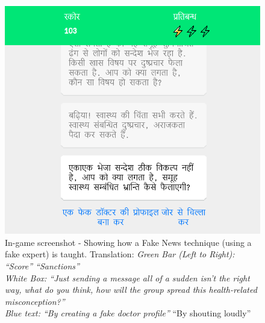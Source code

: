 \documentclass[empirical, authordate, issue]{jote-new-article}
\begin{document}
\begin{figure}

  \includegraphics[width=\linewidth]{media/supplement/images7.jpeg}
  \caption{In-game screenshot - Showing how a Fake News technique (using a fake expert) is taught.
    Translation:
    \emph{Green Bar (Left to Right): “Score” “Sanctions”}\\
    \emph{White Box: “Just sending a message all of a sudden isn't the right way, what do you think, how will the group spread this health-related misconception?”}\\
    \emph{Blue text: “By creating a fake doctor profile”} {“By shouting loudly”}}
  \label{fig:figS7}
\end{figure}

\clearpage
\end{document}
